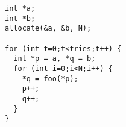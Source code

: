 \begin{lstlisting}[morekeywords={g_qCount},belowskip=0pt]
int *a;
int *b;
allocate(&a, &b, N);

for (int t=0;t<tries;t++) {
  int *p = a, *q = b;
  for (int i=0;i<N;i++) {
    *q = foo(*p);
    p++;
    q++;
  }
}
\end{lstlisting}
